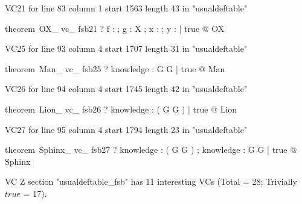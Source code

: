 \documentclass{article}
\begin{document}
VC21 for line 83 column 1 start 1563 length 43 in "usualdeftable"
\begin{zed}
theorem~OX\_ vc\_ fsb21 \vdash ? \forall f : \nat \fun \nat ; g : X ; x : \nat ; y : \power \nat | true @ \pre OX
\end{zed}

VC25 for line 93 column 4 start 1707 length 31 in "usualdeftable"
\begin{zed}
theorem~Man\_ vc\_ fsb25 \vdash ? \forall knowledge : G \fun G | true @ \pre Man
\end{zed}

VC26 for line 94 column 4 start 1745 length 42 in "usualdeftable"
\begin{zed}
theorem~Lion\_ vc\_ fsb26 \vdash ? \forall knowledge : \power ( G \cross G ) | true @ \pre Lion
\end{zed}

VC27 for line 95 column 4 start 1794 length 23 in "usualdeftable"
\begin{zed}
theorem~Sphinx\_ vc\_ fsb27 \vdash ? \forall knowledge : \power ( G \cross G ) ; knowledge : G \fun G | true @ \pre Sphinx
\end{zed}



 VC Z section "usualdeftable_fsb" has $11$ interesting VCs (Total = 28; Trivially $true$ = 17).



\end{document}
